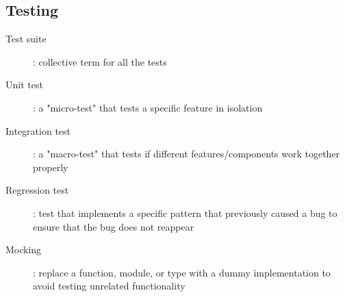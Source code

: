 \documentclass[letterpaper,12pt]{article}
\begin{document}
\subsection{Testing}
\begin{description}
 \item[Test suite]: collective term for all the tests
 \item[Unit test]: a "micro-test" that tests a specific feature in isolation
 \item[Integration test]: a "macro-test" that tests if different features/components work together properly
 \item[Regression test]: test that implements a specific pattern that previously caused a bug to ensure that the bug does not reappear
 \item[Mocking]: replace a function, module, or type with a dummy implementation to avoid testing unrelated functionality
\end{description}
\end{document}
